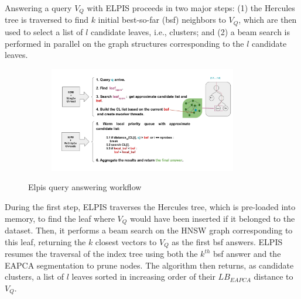Answering a query $V_Q$ with ELPIS proceeds in two major steps: (1) the Hercules tree is traversed to find $k$ initial best-so-far (bsf) neighbors to $V_Q$, which are then used to select a list of $l$ candidate leaves, i.e., clusters; and (2) a beam search is performed in parallel on the graph structures corresponding to the $l$ candidate leaves.

\begin{figure}[tb]
\captionsetup{justification=centering}	
\begin{subfigure}{\textwidth}
\centering
\includegraphics[width=0.90\textwidth] {../img/elpis/search_wf.pdf}
\end{subfigure}
\caption{Elpis query answering workflow}
\label{fig:Elpis-search}
\end{figure}

During the first step, ELPIS traverses the Hercules tree, which is pre-loaded into memory, to find the leaf where $V_Q$ would have been inserted if it belonged to the dataset. Then, it performs a beam search on the HNSW graph corresponding to this leaf, returning the $k$ closest vectors to $V_Q$ as the first bsf answers. ELPIS resumes the traversal of the index tree using both the $k^{th}$ bsf answer and the EAPCA segmentation to prune nodes. The algorithm then returns, as candidate clusters, a list of $l$ leaves sorted in increasing order of their $LB_{EAPCA}$ distance to $V_Q$. 

